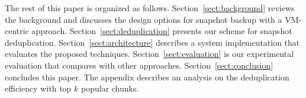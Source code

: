 




The rest of this paper is organized as follows.
Section~\ref{sect:background} reviews the background and discusses the  design options for snapshot backup 
with a VM-centric approach. 
Section~\ref{sect:deduplication}  presents our scheme for  snapshot deduplication. 
Section~\ref{sect:architecture}  describes a system implementation that evaluates the proposed techniques.
Section~\ref{sect:evaluation} is our experimental evaluation that compares with other approaches.
Section~\ref{sect:conclusion}  concludes this paper.
The appendix describes an analysis on the deduplication  efficiency with top $k$ popular chunks. 
